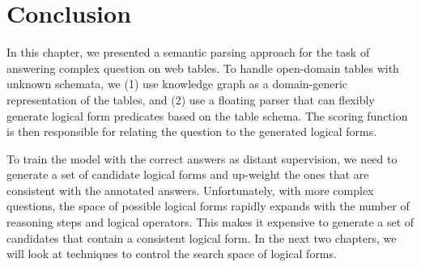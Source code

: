 \section{Conclusion}
In this chapter,
we presented a semantic parsing approach for
the task of answering complex question on web tables.
To handle open-domain tables with unknown schemata,
we (1) use knowledge graph as a domain-generic representation
of the tables,
and (2) use a floating parser that can flexibly
generate logical form predicates based on the table schema.
The scoring function is then responsible for
relating the question to the generated logical forms.

To train the model with the correct answers as distant supervision,
we need to generate a set of candidate logical forms
and up-weight the ones that are consistent with the annotated answers.
Unfortunately, with more complex questions,
the space of possible logical forms rapidly expands
with the number of reasoning steps and logical operators.
This makes it expensive to generate a set of candidates
that contain a consistent logical form.
In the next two chapters, we will look at techniques
to control the search space of logical forms.
